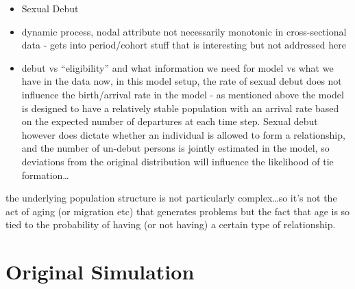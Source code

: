 \documentclass [11pt, proquest] {uwthesis}[2015/03/03]
\providecommand{\tightlist}{%
  \setlength{\itemsep}{0pt}\setlength{\parskip}{0pt}}
\begin{document}
\begin{itemize}
\tightlist
\item
  Sexual Debut\\
\item
  dynamic process, nodal attribute not necessarily monotonic in
  cross-sectional data - gets into period/cohort stuff that is
  interesting but not addressed here
\item
  debut vs ``eligibility'' and what information we need for model vs
  what we have in the data now, in this model setup, the rate of sexual
  debut does not influence the birth/arrival rate in the model - as
  mentioned above the model is designed to have a relatively stable
  population with an arrival rate based on the expected number of
  departures at each time step. Sexual debut however does dictate
  whether an individual is allowed to form a relationship, and the
  number of un-debut persons is jointly estimated in the model, so
  deviations from the original distribution will influence the
  likelihood of tie formation\ldots{}
\end{itemize}
the underlying population structure is not particularly
complex\ldots{}so it's not the act of aging (or migration etc) that
generates problems but the fact that age is so tied to the probability
of having (or not having) a certain type of relationship.

\section{Original Simulation}\label{original-simulation}
\end{document}
